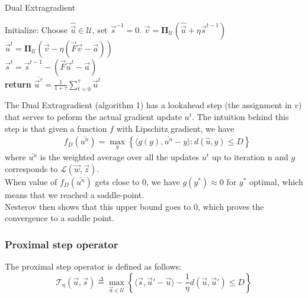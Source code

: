 \documentclass{article}
\begin{document}
\begin{algorithm}[tb]
   \caption{Dual Extragradient}
   \label{alg:example}
\begin{algorithmic}
  \STATE Initialize: Choose $\hat{\vec u} \in \mathcal{U}$, set $\vec s^{-1} = 0$.
  \STATE $\vec v = \mathbf{\Pi}_{\mathcal{U}}(\hat{\vec u} + \eta \vec s^{t-1})$\\
  \STATE $\vec u^t = \mathbf{\Pi}_{\mathcal{U}}(\vec v - \eta (\vec F \vec v - \vec a))$\\
  \STATE $\vec s^t =  \vec s^{t-1} - (\vec F \vec u^t - \vec a)$
  \ENDFOR\\
  \STATE \textbf{return} $\overline{\vec u^{\tau}} = \frac{1}{1 + \tau} \sum_{t=0}^{\tau} \vec u^t$
\end{algorithmic}
\end{algorithm}

The Dual Extragradient (algorithm 1) has a lookahead step (the assignment in $v$) that serves to peform the actual
gradient update $u^t$. The intuition behind this step is that given a
function $f$ with Lipschitz gradient, we have
\begin{equation*}
\begin{aligned}
    &f_{D}(\bar{u^n}) = \max_y \left \{ \langle g(y),\bar{u^n} - y\rangle : d(\hat{u},y) \leq D \right \}   
\end{aligned}
\end{equation*}
where $\bar{u^n}$ is the weighted
average over all the updates $u^t$ up to iteration n and $g$ corresponds
to $\mathcal{L}(\vec w,\vec z)$.\\
When value of $f_D(\bar{u^n})$
gets close to 0, we have $g(y^*)\approx 0$ for $y^*$ optimal, which means that we reached a saddle-point.\\
Nesterov then shows that this upper bound goes to $0$, which proves the convergence to a saddle point.
\subsubsection{Proximal step operator}
The proximal step operator is defined as follows:
\begin{equation}
  \mathcal{T}_{\eta}(\vec u, \vec s) \overset{\Delta}{=} \max_{\vec u \in \mathcal{U}} \left \{ \langle \vec s, \vec u' - \vec u \rangle - \frac{1}{\eta}  d(\vec u, \vec u') \leq D \right \}
\end{equation}
\end{document}
